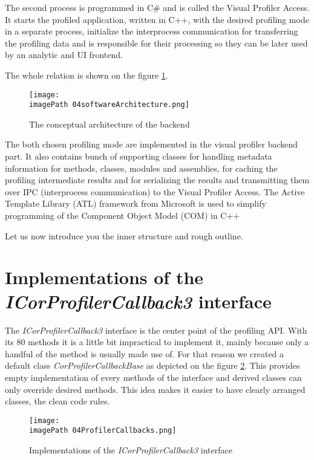 The second process is programmed in C\# and is called the Visual Profiler Access. It starts the profiled application, written in C++, with the desired profiling mode in a separate process, initialize the interprocess communication for transferring the profiling data and is responsible for their processing so they can be later used by an analytic and UI frontend.

The whole relation is shown on the figure \ref{fig:04softwareArchitecture}.

\begin{figure}
	\centering
		\texttt{[image: \\imagePath 04softwareArchitecture.png]}
		\caption{The conceptual architecture of the backend}
	\label{fig:04softwareArchitecture}
\end{figure}

The both chosen profiling mode are implemented in the visual profiler backend part. It also contains bunch of supporting classes for handling metadata information for methods, classes, modules and assemblies, for caching the profiling intermediate results and for serializing the results and transmitting them over IPC (interprocess communication) to the Visual Profiler Access. The Active Template Library (ATL) framework from Microsoft is used to simplify programming of the Component Object Model (COM) in C++

Let us now introduce you the inner structure and rough outline.

\section{Implementations of the \textit{ICorProfilerCallback3 } interface}
The \textit{ICorProfilerCallback3} interface is the center point of the profiling API. With its 80 methods it is a little bit impractical to implement it, mainly because only a handful of the method is usually made use of. For that reason we created a default class \textit{CorProfilerCallbackBase} as depicted on the figure \ref{fig:04ProfilerCallbacks}. This provides empty implementation of every methods of the interface and derived classes can only override desired methods. This idea makes it easier to have clearly arranged classes, the clean code rules.

\begin{figure}
	\centering
		\texttt{[image: \\imagePath 04ProfilerCallbacks.png]}
		\caption{Implementations of the \textit{ICorProfilerCallback3} interface}
	\label{fig:04ProfilerCallbacks}
\end{figure}

